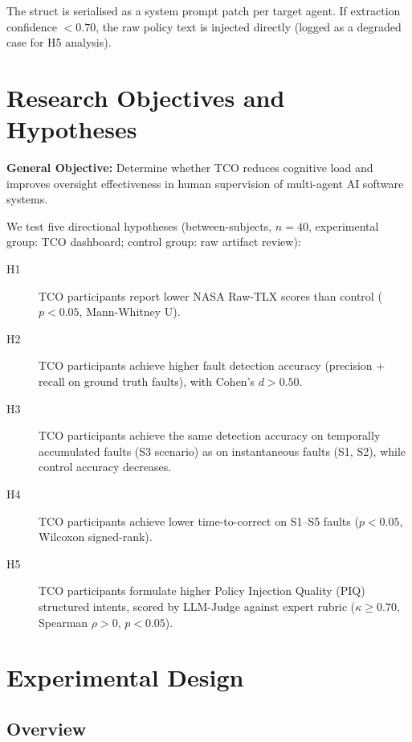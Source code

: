 \documentclass[manuscript,review,anonymous]{acmart}
\begin{document}
\noindent The struct is serialised as a system prompt patch per target agent.
If extraction confidence $< 0.70$, the raw policy text is injected directly
(logged as a degraded case for H5 analysis).

\section{Research Objectives and Hypotheses}

\noindent \textbf{General Objective:} Determine whether TCO reduces cognitive load and
improves oversight effectiveness in human supervision of multi-agent AI software systems.

\smallskip
\noindent We test five directional hypotheses (between-subjects, $n = 40$,
experimental group: TCO dashboard; control group: raw artifact review):

\begin{description}
  \item[H1] TCO participants report lower NASA Raw-TLX scores than control
    ($p < 0.05$, Mann-Whitney U).
  \item[H2] TCO participants achieve higher fault detection accuracy
    (precision + recall on ground truth faults), with Cohen's $d > 0.50$.
  \item[H3] TCO participants achieve the same detection accuracy on
    temporally accumulated faults (S3 scenario) as on instantaneous faults (S1, S2),
    while control accuracy decreases.
  \item[H4] TCO participants achieve lower time-to-correct on S1--S5 faults
    ($p < 0.05$, Wilcoxon signed-rank).
  \item[H5] TCO participants formulate higher Policy Injection Quality (PIQ)
    structured intents, scored by LLM-Judge against expert rubric
    ($\kappa \geq 0.70$, Spearman $\rho > 0$, $p < 0.05$).
\end{description}

\section{Experimental Design}

\subsection{Overview}
\end{document}
